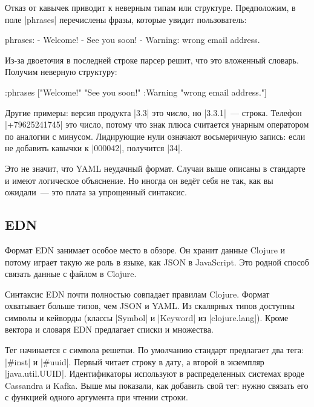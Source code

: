 Отказ от кавычек приводит к неверным типам или структуре. Предположим, в
поле \spverb|phrases| перечислены фразы, которые увидит пользователь:

\begin{english}
  \begin{yaml}
phrases:
  - Welcome!
  - See you soon!
  - Warning: wrong email address.
  \end{yaml}
\end{english}

Из-за двоеточия в последней строке парсер решит, что это вложенный
словарь. Получим неверную структуру:

\begin{english}
  \begin{clojure}
{:phrases
 ["Welcome!"
  "See you soon!"
  {:Warning "wrong email address."}]}
  \end{clojure}
\end{english}

Другие примеры: версия продукта \spverb|3.3| это число, но \spverb|3.3.1|~---
строка. Телефон \spverb|+79625241745| это число, потому что знак плюса считается
унарным оператором по аналогии с минусом. Лидирующие нули означают восьмеричную
запись: если не добавить кавычки к \spverb|000042|, получится \spverb|34|.

Это не значит, что YAML неудачный формат. Случаи выше описаны в стандарте и
имеют логическое объяснение. Но иногда он вед\"{е}т себя не так, как вы ожидали~---
это плата за упрощенный синтаксис.

\subsection{EDN}


Формат EDN занимает особое место в обзоре. Он хранит данные Clojure и потому
играет такую же роль в языке, как JSON в JavaScript. Это родной способ связать
данные с файлом в Clojure.

Синтаксис EDN почти полностью совпадает правилам Clojure. Формат охватывает
больше типов, чем JSON и YAML. Из скалярных типов доступны символы и
кейворды (классы \spverb|Symbol| и \spverb|Keyword| из
\spverb|clojure.lang|). Кроме вектора и словаря EDN предлагает списки и
множества.


Тег начинается с символа решетки. По умолчанию стандарт предлагает два тега:
\spverb|#inst| и \spverb|#uuid|. Первый читает строку в дату, а второй в
экземпляр \spverb|java.util.UUID|. Идентификаторы используют в распределенных
системах вроде Cassandra и Kafka. Выше мы показали, как добавить свой тег: нужно
связать его с функцией одного аргумента при чтении строки.

